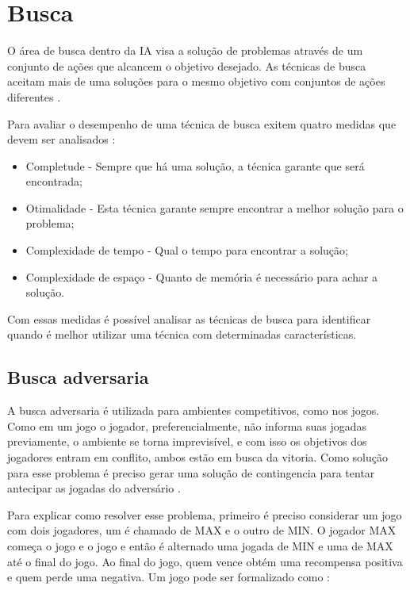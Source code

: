 \chapter{\label{chap:busca}Busca}

O área de busca dentro da IA visa a solução de problemas através de um conjunto de ações que alcancem o objetivo desejado. As técnicas de busca aceitam mais de uma soluções para o mesmo objetivo com conjuntos de ações diferentes \cite{intelligence2003modern}. 

Para avaliar o desempenho de uma técnica de busca exitem quatro medidas que devem ser analisados \cite{intelligence2003modern}:
\begin{itemize}
	\item Completude - Sempre que há uma solução, a técnica garante que será encontrada;
	\item Otimalidade - Esta técnica garante sempre encontrar a melhor solução para o problema;
	\item Complexidade de tempo - Qual o tempo para encontrar a solução;
	\item Complexidade de espaço - Quanto de memória é necessário para achar a solução.
\end{itemize}   

Com essas medidas é possível analisar as técnicas de busca para identificar quando é melhor utilizar uma técnica com determinadas características. 
\section{Busca adversaria}

A busca adversaria é utilizada para ambientes competitivos, como nos jogos. Como em um jogo o jogador, preferencialmente, não informa suas jogadas previamente, o ambiente se torna imprevisível, e com isso os objetivos dos jogadores entram em conflito, ambos estão em busca da vitoria. Como solução para esse problema é preciso gerar uma solução de contingencia para tentar antecipar as jogadas do adversário \cite{intelligence2003modern}. 

Para explicar como resolver esse problema, primeiro é preciso considerar um jogo com dois jogadores, um é chamado de MAX e o outro de MIN. O jogador MAX começa o jogo e o jogo e então é alternado uma jogada de MIN e uma de MAX até o final do jogo. Ao final do jogo, quem vence obtém uma recompensa positiva e quem perde uma negativa. Um jogo pode ser formalizado como \cite{intelligence2003modern}:

